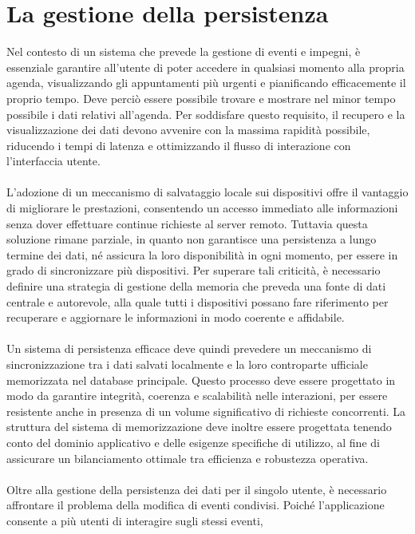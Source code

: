 \chapter{La gestione della persistenza}

Nel contesto di un sistema che prevede la gestione di eventi e impegni,
è essenziale garantire all’utente di poter accedere in qualsiasi momento alla propria agenda,
visualizzando gli appuntamenti più urgenti e pianificando efficacemente il proprio tempo.
Deve perciò essere possibile trovare e mostrare nel minor tempo possibile i dati relativi all’agenda.
Per soddisfare questo requisito,
il recupero e la visualizzazione dei dati devono avvenire con la massima rapidità possibile,
riducendo i tempi di latenza e ottimizzando il flusso di interazione con l’interfaccia utente.\\
\\
L'adozione di un meccanismo di salvataggio locale sui dispositivi
offre il vantaggio di migliorare le prestazioni,
consentendo un accesso immediato alle informazioni senza dover effettuare continue richieste al server remoto.
Tuttavia questa soluzione rimane parziale,
in quanto non garantisce una persistenza a lungo termine dei dati,
né assicura la loro disponibilità in ogni momento,
per essere in grado di sincronizzare più dispositivi.
Per superare tali criticità,
è necessario definire una strategia di gestione della memoria
che preveda una fonte di dati centrale e autorevole,
alla quale tutti i dispositivi possano fare riferimento per recuperare e
aggiornare le informazioni in modo coerente e affidabile.\\
\\
Un sistema di persistenza efficace deve quindi prevedere
un meccanismo di sincronizzazione tra i dati salvati localmente e
la loro controparte ufficiale memorizzata nel database principale.
Questo processo deve essere progettato in modo da garantire
integrità, coerenza e scalabilità nelle interazioni,
per essere resistente anche in presenza di un volume significativo di richieste concorrenti.
La struttura del sistema di memorizzazione deve inoltre essere progettata
tenendo conto del dominio applicativo e delle esigenze specifiche di utilizzo,
al fine di assicurare un bilanciamento ottimale tra efficienza e robustezza operativa.\\
\\
Oltre alla gestione della persistenza dei dati per il singolo utente,
è necessario affrontare il problema della modifica di eventi condivisi.
Poiché l'applicazione consente a più utenti di interagire sugli stessi eventi,
